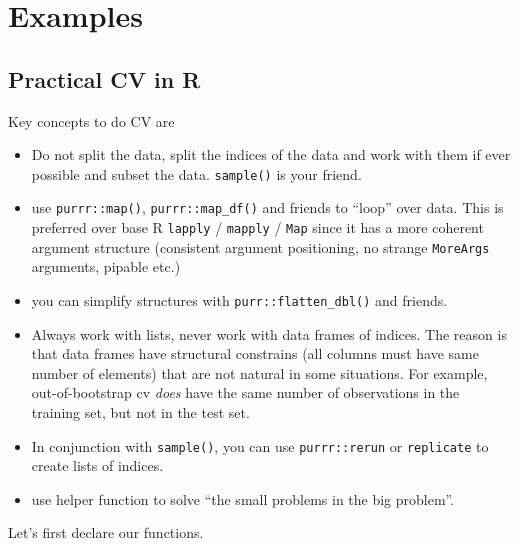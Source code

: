 \documentclass[]{book}
\providecommand{\tightlist}{%
  \setlength{\itemsep}{0pt}\setlength{\parskip}{0pt}}
\begin{document}
\section{Examples}\label{examples}

\subsection{Practical CV in R}\label{practical-cv-in-r}

Key concepts to do CV are

\begin{itemize}
\tightlist
\item
  Do not split the data, split the indices of the data and work with
  them if ever possible and subset the data. \texttt{sample()} is your
  friend.
\item
  use \texttt{purrr::map()}, \texttt{purrr::map\_df()} and friends to
  ``loop'' over data. This is preferred over base R \texttt{lapply} /
  \texttt{mapply} / \texttt{Map} since it has a more coherent argument
  structure (consistent argument positioning, no strange
  \texttt{MoreArgs} arguments, pipable etc.)
\item
  you can simplify structures with \texttt{purr::flatten\_dbl()} and
  friends.
\item
  Always work with lists, never work with data frames of indices. The
  reason is that data frames have structural constrains (all columns
  must have same number of elements) that are not natural in some
  situations. For example, out-of-bootstrap cv \emph{does} have the same
  number of observations in the training set, but not in the test set.
\item
  In conjunction with \texttt{sample()}, you can use
  \texttt{purrr::rerun} or \texttt{replicate} to create lists of
  indices.
\item
  use helper function to solve ``the small problems in the big
  problem''.
\end{itemize}

Let's first declare our functions.
\end{document}
